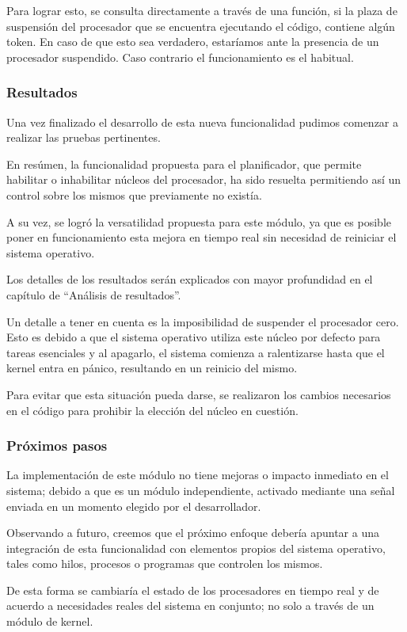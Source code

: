 Para lograr esto, se consulta directamente a través de una función, si la plaza de suspensión del procesador que se encuentra ejecutando el código, contiene algún token. En caso de que esto sea verdadero, estaríamos ante la presencia de un procesador suspendido. Caso contrario el funcionamiento es el habitual.\par


\subsubsection{Resultados}

Una vez finalizado el desarrollo de esta nueva funcionalidad pudimos comenzar a realizar las pruebas pertinentes.\par

En resúmen, la funcionalidad propuesta para el planificador, que permite habilitar o inhabilitar núcleos del procesador, ha sido resuelta permitiendo así un control sobre los mismos que previamente no existía.\par

A su vez, se logró la versatilidad propuesta para este módulo, ya que es posible poner en funcionamiento esta mejora en tiempo real sin necesidad de reiniciar el sistema operativo.\par

Los detalles de los resultados serán explicados con mayor profundidad en el capítulo de
“Análisis de resultados”.\par

Un detalle a tener en cuenta es la imposibilidad de suspender el procesador cero. Esto es debido a que el sistema operativo utiliza este núcleo por defecto para tareas esenciales y al apagarlo, el sistema comienza a ralentizarse hasta que el kernel entra en pánico, resultando en un reinicio del mismo.\par

Para evitar que esta situación pueda darse, se realizaron los cambios necesarios en el código para prohibir la elección del núcleo en cuestión.\par


\subsubsection{Próximos pasos}

La implementación de este módulo no tiene mejoras o impacto inmediato en el sistema;  debido a que es un módulo independiente, activado mediante una señal enviada en un momento elegido por el desarrollador.\par

Observando a futuro, creemos que el próximo enfoque debería apuntar a una integración de esta funcionalidad con elementos propios del sistema operativo, tales como hilos, procesos o programas que controlen los mismos.\par

De esta forma se cambiaría el estado de los procesadores en tiempo real y de acuerdo a necesidades reales del sistema en conjunto; no solo a través de un módulo de kernel.\par
